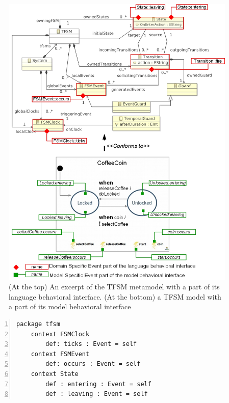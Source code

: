 	\begin{figure}
		\begin{center}
			\includegraphics[width=1\textwidth]{bcool/figs/tfsmmm.jpg}
			\caption{(At the top) An excerpt of the TFSM metamodel with a part of its language behavioral interface. (At the bottom) a TFSM model with a part of its model behavioral interface}
			\label{fig:tfsmmm}
		\end{center}
	\end{figure}
	
	\begin{lstlisting}[language=ecl,
	caption={Partial \ecl specification of TFSM},
	label={fig:tfsmmmecl}, 
	basicstyle=\scriptsize\ttfamily, backgroundcolor=\color{LGrey}, numbers=left, xleftmargin=3pt]
	package tfsm
	context FSMClock
		def: ticks : Event = self
	context FSMEvent
		def: occurs : Event = self
	context State
		def : entering : Event = self
		def : leaving : Event = self
	\end{lstlisting}
	
